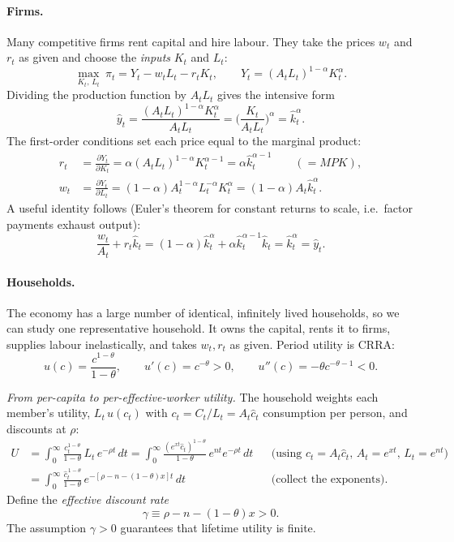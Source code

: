 \paragraph{Firms.} Many competitive firms rent capital and hire labour. They take the prices $w_t$ and $r_t$ as given and choose the \emph{inputs} $K_t$ and $L_t$:
\[
\max_{K_t,\,L_t}\ \pi_t = Y_t - w_tL_t - r_tK_t,\qquad Y_t=(A_tL_t)^{1-\alpha}K_t^{\alpha}.
\]
Dividing the production function by $A_tL_t$ gives the intensive form
\[
\hat y_t=\frac{(A_tL_t)^{1-\alpha}K_t^\alpha}{A_tL_t}=\Big(\frac{K_t}{A_tL_t}\Big)^{\alpha}=\hat k_t^{\alpha}.
\]
The first-order conditions set each price equal to the marginal product:
\begin{align}
r_t&=\frac{\partial Y_t}{\partial K_t}=\alpha (A_tL_t)^{1-\alpha}K_t^{\alpha-1}=\alpha\hat k_t^{\alpha-1}\qquad(=MPK), \label{rm:r}\\
w_t&=\frac{\partial Y_t}{\partial L_t}=(1-\alpha)A_t^{1-\alpha}L_t^{-\alpha}K_t^{\alpha}=(1-\alpha)A_t\hat k_t^{\alpha}. \label{rm:w}
\end{align}
A useful identity follows (Euler's theorem for constant returns to scale, i.e.\ factor payments exhaust output):
\begin{equation}
\frac{w_t}{A_t}+r_t\hat k_t=(1-\alpha)\hat k_t^\alpha+\alpha\hat k_t^{\alpha-1}\hat k_t=\hat k_t^\alpha=\hat y_t. \label{rm:exhaust}
\end{equation}

\paragraph{Households.} The economy has a large number of identical, infinitely lived households, so we can study one representative household. It owns the capital, rents it to firms, supplies labour inelastically, and takes $w_t,r_t$ as given. Period utility is CRRA:
\[
u(c)=\frac{c^{1-\theta}}{1-\theta},\qquad u'(c)=c^{-\theta}>0,\qquad u''(c)=-\theta c^{-\theta-1}<0 .
\]

\emph{From per-capita to per-effective-worker utility.} The household weights each member's utility, $L_t\,u(c_t)$ with $c_t=C_t/L_t=A_t\hat c_t$ consumption per person, and discounts at $\rho$:
\begin{align*}
U&=\int_0^\infty \frac{c_t^{1-\theta}}{1-\theta}\,L_t\,e^{-\rho t}\,dt
=\int_0^\infty \frac{(e^{xt}\hat c_t)^{1-\theta}}{1-\theta}\,e^{nt}e^{-\rho t}\,dt
&&\text{(using $c_t=A_t\hat c_t$, $A_t=e^{xt}$, $L_t=e^{nt}$)}\\
&=\int_0^\infty \frac{\hat c_t^{\,1-\theta}}{1-\theta}\,e^{-[\rho-n-(1-\theta)x]t}\,dt
&&\text{(collect the exponents)}.
\end{align*}
Define the \emph{effective discount rate}
\begin{equation}
\gamma\equiv\rho-n-(1-\theta)x>0 . \label{rm:gamma}
\end{equation}
The assumption $\gamma>0$ guarantees that lifetime utility is finite.

